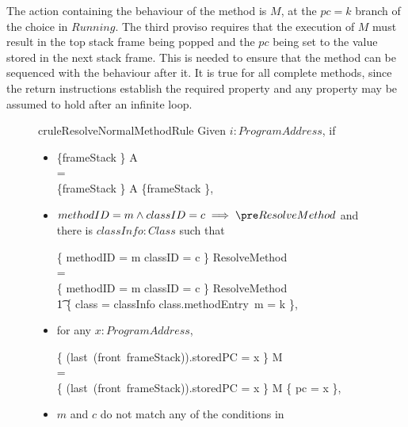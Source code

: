 The action containing the behaviour of the method is $M$, at the
$pc = k$ branch of the choice in $Running$.
The third proviso requires that the execution of $M$ must result in
the top stack frame being popped and the $pc$ being set to the value
stored in the next stack frame.
This is needed to ensure that the method can be sequenced with the
behaviour after it.
It is true for all complete methods, since the return instructions
establish the required property and any property may be assumed to
hold after an infinite loop.
\begin{figure}[thp]
\begin{restatable}{crule}{ResolveNormalMethodRule}
  \label{resolve-normal-method-rule}
  Given $i : ProgramAddress$, if
  \setlength{\zedindent}{0.5cm}
  \begin{itemize}
  \item \hfill{\vspace*{-\baselineskip}\setlength{\abovedisplayskip}{0cm}\setlength{\abovedisplayshortskip}{0cm}
      \begin{circus}
      \{frameStack \neq \emptyset\} \circseq A \\
      {} = {} \\
      \{frameStack \neq \emptyset\} \circseq A \circseq \{frameStack \neq \emptyset\},
    \end{circus}}
  \item $methodID = m \land classID = c \implies \pre ResolveMethod$ and there is $classInfo : Class$ such that
    \begin{circus}
      \{ methodID = m \land classID = c \} \circseq \lschexpract ResolveMethod \rschexpract \\
      {} = {} \\
      \{ methodID = m \land classID = c \} \circseq \lschexpract ResolveMethod \rschexpract \circseq  \\
      \t1 \{ class = classInfo \land class.methodEntry~m = k \},
    \end{circus}
  \item for any $x : ProgramAddress$,
    \begin{circus}
      \{ (last~(front~frameStack)).storedPC = x \} \circseq M \\
      {} = {} \\
      \{ (last~(front~frameStack)).storedPC = x \} \circseq M \circseq \{ pc = x \},
    \end{circus}
  \item $m$ and $c$ do not match any of the conditions in

\end{itemize}
\end{restatable}
\end{figure}
